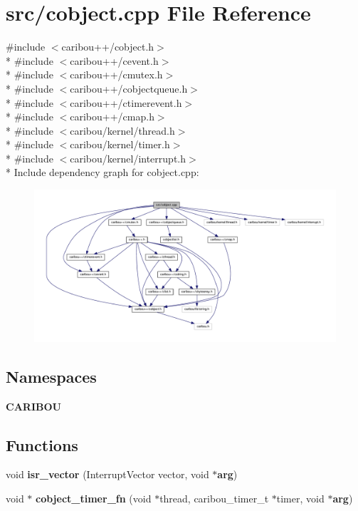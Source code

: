 \section{src/cobject.cpp File Reference}
\label{cobject_8cpp}
{\ttfamily \#include $<$caribou++/cobject.\+h$>$}\\*
{\ttfamily \#include $<$caribou++/cevent.\+h$>$}\\*
{\ttfamily \#include $<$caribou++/cmutex.\+h$>$}\\*
{\ttfamily \#include $<$caribou++/cobjectqueue.\+h$>$}\\*
{\ttfamily \#include $<$caribou++/ctimerevent.\+h$>$}\\*
{\ttfamily \#include $<$caribou++/cmap.\+h$>$}\\*
{\ttfamily \#include $<$caribou/kernel/thread.\+h$>$}\\*
{\ttfamily \#include $<$caribou/kernel/timer.\+h$>$}\\*
{\ttfamily \#include $<$caribou/kernel/interrupt.\+h$>$}\\*
Include dependency graph for cobject.\+cpp\+:
\nopagebreak
\begin{figure}[H]
\begin{center}
\leavevmode
\includegraphics[width=350pt]{cobject_8cpp__incl}
\end{center}
\end{figure}
\subsection*{Namespaces}
\begin{DoxyCompactItemize}
\item 
 {\bf C\+A\+R\+I\+B\+OU}
\end{DoxyCompactItemize}
\subsection*{Functions}
\begin{DoxyCompactItemize}
\item 
void {\bf isr\+\_\+vector} (Interrupt\+Vector vector, void $\ast${\bf arg})
\item 
void $\ast$ {\bf cobject\+\_\+timer\+\_\+fn} (void $\ast$thread, caribou\+\_\+timer\+\_\+t $\ast$timer, void $\ast${\bf arg})
\end{DoxyCompactItemize}
